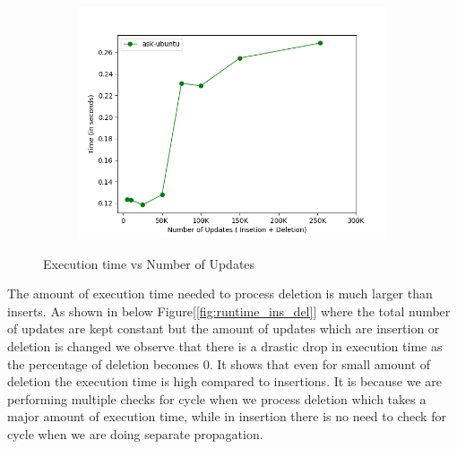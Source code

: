 \documentclass[a4paper]{article}
\begin{document}
\begin{figure}[H]
\begin{subfigure}[b]{0.32\textwidth}
         \caption{}
         \label{fig:dynamic_trend_2}
    \end{subfigure}
    \hfill
    \begin{subfigure}[b]{0.32\textwidth}
         \centering
         \includegraphics[width=\textwidth]{img/dyn/u3.png}
         \caption{}
         \label{fig:dynamic_trend_3}
    \end{subfigure}
    \caption{Execution time vs Number of Updates}
    \label{fig:dynamic_trend}
\end{figure}
The amount of execution time needed to process deletion is much larger than inserts. As shown in below Figure[\ref{fig:runtime_ins_del}] where the total number of updates are kept constant but the amount of updates which are insertion or deletion is changed we observe that there is a drastic drop in execution time as the percentage of deletion becomes 0. It shows that even for small amount of deletion the execution time is high compared to insertions. It is because we are performing multiple checks for cycle when we process deletion which takes a major amount of execution time, while in insertion there is no need to check for cycle when we are doing separate propagation.
\end{document}
